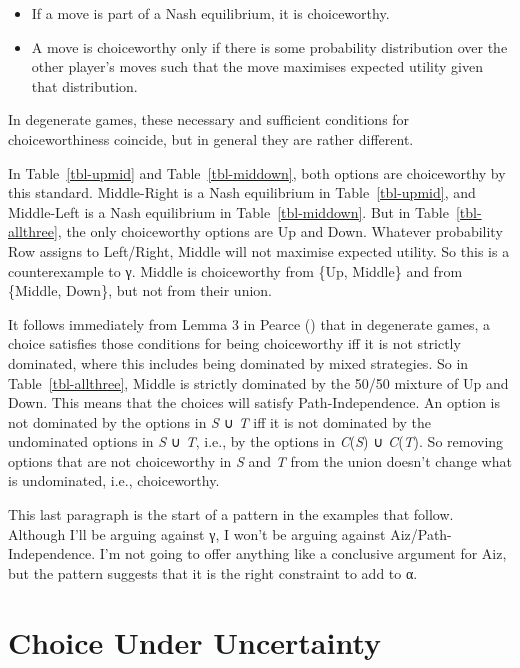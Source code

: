 \documentclass[
  11pt,
  letterpaper,
  DIV=11,
  numbers=noendperiod,
  twoside]{scrartcl}
\providecommand{\tightlist}{%
  \setlength{\itemsep}{0pt}\setlength{\parskip}{0pt}}
\begin{document}
\begin{itemize}
\tightlist
\item
  If a move is part of a Nash equilibrium, it is choiceworthy.
\item
  A move is choiceworthy only if there is some probability distribution
  over the other player's moves such that the move maximises expected
  utility given that distribution.
\end{itemize}

In degenerate games, these necessary and sufficient conditions for
choiceworthiness coincide, but in general they are rather different.

In Table~\ref{tbl-upmid} and Table~\ref{tbl-middown}, both options are
choiceworthy by this standard. Middle-Right is a Nash equilibrium in
Table~\ref{tbl-upmid}, and Middle-Left is a Nash equilibrium in
Table~\ref{tbl-middown}. But in Table~\ref{tbl-allthree}, the only
choiceworthy options are Up and Down. Whatever probability Row assigns
to Left/Right, Middle will not maximise expected utility. So this is a
counterexample to γ. Middle is choiceworthy from \{Up, Middle\} and from
\{Middle, Down\}, but not from their union.

It follows immediately from Lemma 3 in Pearce
() that in degenerate games, a choice
satisfies those conditions for being choiceworthy iff it is not strictly
dominated, where this includes being dominated by mixed strategies. So
in Table~\ref{tbl-allthree}, Middle is strictly dominated by the 50/50
mixture of Up and Down. This means that the choices will satisfy
Path-Independence. An option is not dominated by the options in \emph{S}
∪ \emph{T} iff it is not dominated by the undominated options in
\emph{S} ∪ \emph{T}, i.e., by the options in \emph{C}(\emph{S}) ∪
\emph{C}(\emph{T}). So removing options that are not choiceworthy in
\emph{S} and \emph{T} from the union doesn't change what is undominated,
i.e., choiceworthy.

This last paragraph is the start of a pattern in the examples that
follow. Although I'll be arguing against γ, I won't be arguing against
Aiz/Path-Independence. I'm not going to offer anything like a conclusive
argument for Aiz, but the pattern suggests that it is the right
constraint to add to α.

\section{Choice Under Uncertainty}\label{sec-uncertainty}
\end{document}
